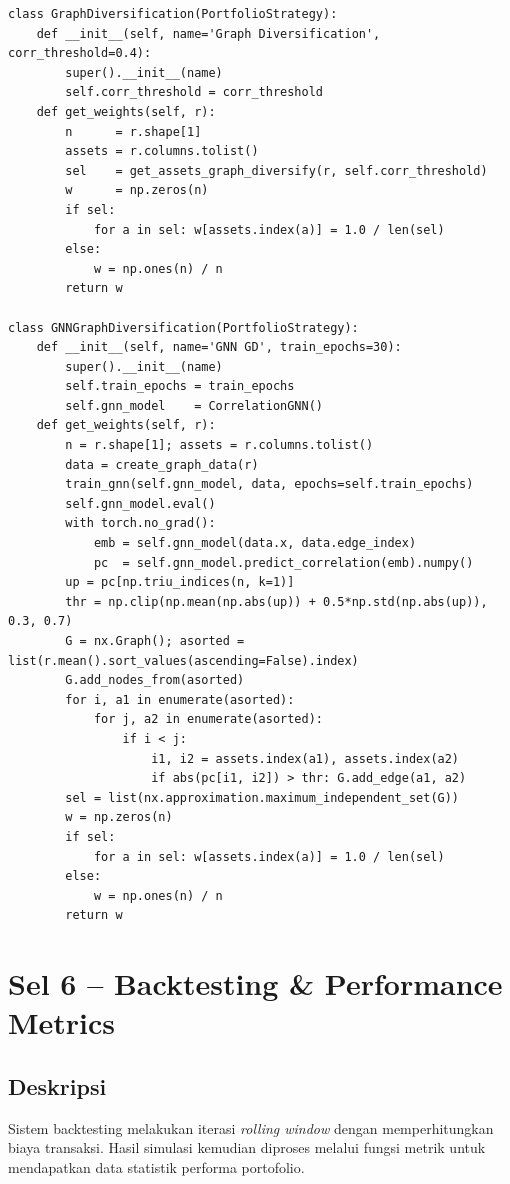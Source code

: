 \documentclass[12pt,a4paper]{article}
\begin{document}
\begin{lstlisting}[caption={Implementasi berbagai strategi portofolio}]
class GraphDiversification(PortfolioStrategy):
    def __init__(self, name='Graph Diversification', corr_threshold=0.4):
        super().__init__(name)
        self.corr_threshold = corr_threshold
    def get_weights(self, r):
        n      = r.shape[1]
        assets = r.columns.tolist()
        sel    = get_assets_graph_diversify(r, self.corr_threshold)
        w      = np.zeros(n)
        if sel:
            for a in sel: w[assets.index(a)] = 1.0 / len(sel)
        else:
            w = np.ones(n) / n
        return w

class GNNGraphDiversification(PortfolioStrategy):
    def __init__(self, name='GNN GD', train_epochs=30):
        super().__init__(name)
        self.train_epochs = train_epochs
        self.gnn_model    = CorrelationGNN()
    def get_weights(self, r):
        n = r.shape[1]; assets = r.columns.tolist()
        data = create_graph_data(r)
        train_gnn(self.gnn_model, data, epochs=self.train_epochs)
        self.gnn_model.eval()
        with torch.no_grad():
            emb = self.gnn_model(data.x, data.edge_index)
            pc  = self.gnn_model.predict_correlation(emb).numpy()
        up = pc[np.triu_indices(n, k=1)]
        thr = np.clip(np.mean(np.abs(up)) + 0.5*np.std(np.abs(up)), 0.3, 0.7)
        G = nx.Graph(); asorted = list(r.mean().sort_values(ascending=False).index)
        G.add_nodes_from(asorted)
        for i, a1 in enumerate(asorted):
            for j, a2 in enumerate(asorted):
                if i < j:
                    i1, i2 = assets.index(a1), assets.index(a2)
                    if abs(pc[i1, i2]) > thr: G.add_edge(a1, a2)
        sel = list(nx.approximation.maximum_independent_set(G))
        w = np.zeros(n)
        if sel:
            for a in sel: w[assets.index(a)] = 1.0 / len(sel)
        else:
            w = np.ones(n) / n
        return w
\end{lstlisting}

\section{Sel 6 -- Backtesting \& Performance Metrics}

\subsection{Deskripsi}
Sistem backtesting melakukan iterasi \textit{rolling window} dengan memperhitungkan biaya transaksi. Hasil simulasi kemudian diproses melalui fungsi metrik untuk mendapatkan data statistik performa portofolio.
\end{document}
